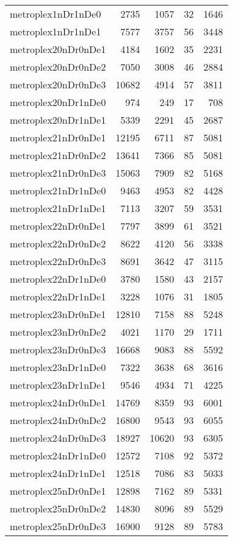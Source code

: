 \begin{longtable}{lrrrr}
metroplex1nDr1nDe0 & 2735 & 1057 & 32 & 1646 \\
metroplex1nDr1nDe1 & 7577 & 3757 & 56 & 3448 \\
metroplex20nDr0nDe1 & 4184 & 1602 & 35 & 2231 \\
metroplex20nDr0nDe2 & 7050 & 3008 & 46 & 2884 \\
metroplex20nDr0nDe3 & 10682 & 4914 & 57 & 3811 \\
metroplex20nDr1nDe0 & 974 & 249 & 17 & 708 \\
metroplex20nDr1nDe1 & 5339 & 2291 & 45 & 2687 \\
metroplex21nDr0nDe1 & 12195 & 6711 & 87 & 5081 \\
metroplex21nDr0nDe2 & 13641 & 7366 & 85 & 5081 \\
metroplex21nDr0nDe3 & 15063 & 7909 & 82 & 5168 \\
metroplex21nDr1nDe0 & 9463 & 4953 & 82 & 4428 \\
metroplex21nDr1nDe1 & 7113 & 3207 & 59 & 3531 \\
metroplex22nDr0nDe1 & 7797 & 3899 & 61 & 3521 \\
metroplex22nDr0nDe2 & 8622 & 4120 & 56 & 3338 \\
metroplex22nDr0nDe3 & 8691 & 3642 & 47 & 3115 \\
metroplex22nDr1nDe0 & 3780 & 1580 & 43 & 2157 \\
metroplex22nDr1nDe1 & 3228 & 1076 & 31 & 1805 \\
metroplex23nDr0nDe1 & 12810 & 7158 & 88 & 5248 \\
metroplex23nDr0nDe2 & 4021 & 1170 & 29 & 1711 \\
metroplex23nDr0nDe3 & 16668 & 9083 & 88 & 5592 \\
metroplex23nDr1nDe0 & 7322 & 3638 & 68 & 3616 \\
metroplex23nDr1nDe1 & 9546 & 4934 & 71 & 4225 \\
metroplex24nDr0nDe1 & 14769 & 8359 & 93 & 6001 \\
metroplex24nDr0nDe2 & 16800 & 9543 & 93 & 6055 \\
metroplex24nDr0nDe3 & 18927 & 10620 & 93 & 6305 \\
metroplex24nDr1nDe0 & 12572 & 7108 & 92 & 5372 \\
metroplex24nDr1nDe1 & 12518 & 7086 & 83 & 5033 \\
metroplex25nDr0nDe1 & 12898 & 7162 & 89 & 5331 \\
metroplex25nDr0nDe2 & 14830 & 8096 & 89 & 5529 \\
metroplex25nDr0nDe3 & 16900 & 9128 & 89 & 5783 \\

\end{longtable}
